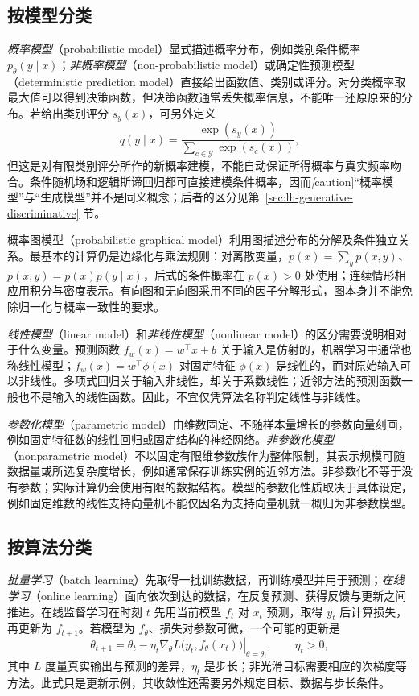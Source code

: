 \subsection{按模型分类}
\label{subsec:lh-model-categories}

\emph{概率模型}（probabilistic model）显式描述概率分布，例如类别条件概率 $p_\theta(y\mid x)$；\emph{非概率模型}（non-probabilistic model）或确定性预测模型（deterministic prediction model）直接给出函数值、类别或评分。对分类概率取最大值可以得到决策函数，但决策函数通常丢失概率信息，不能唯一还原原来的分布。若给出类别评分 $s_y(x)$，可另外定义
\[
    q(y\mid x)=\frac{\exp(s_y(x))}{\sum_{c\in\mathcal Y}\exp(s_c(x))},
\]
但这是对有限类别评分所作的新概率建模，不能自动保证所得概率与真实频率吻合。条件随机场和逻辑斯谛回归都可直接建模条件概率，因而\emph[caution]{“概率模型”与“生成模型”并不是同义概念}；后者的区分见第~\ref{sec:lh-generative-discriminative} 节。

概率图模型（probabilistic graphical model）利用图描述分布的分解及条件独立关系。最基本的计算仍是边缘化与乘法规则：对离散变量，$p(x)=\sum_y p(x,y)$、$p(x,y)=p(x)p(y\mid x)$，后式的条件概率在 $p(x)>0$ 处使用；连续情形相应用积分与密度表示。有向图和无向图采用不同的因子分解形式，图本身并不能免除归一化与概率一致性的要求。

\emph{线性模型}（linear model）和\emph{非线性模型}（nonlinear model）的区分需要说明相对于什么变量。预测函数 $f_w(x)=w^\top x+b$ 关于输入是仿射的，机器学习中通常也称线性模型；$f_w(x)=w^\top\phi(x)$ 对固定特征 $\phi(x)$ 是线性的，而对原始输入可以非线性。多项式回归关于输入非线性，却关于系数线性；近邻方法的预测函数一般也不是输入的线性函数。因此，不宜仅凭算法名称判定线性与非线性。

\emph{参数化模型}（parametric model）由维数固定、不随样本量增长的参数向量刻画，例如固定特征数的线性回归或固定结构的神经网络。\emph{非参数化模型}（nonparametric model）不以固定有限维参数族作为整体限制，其表示规模可随数据量或所选复杂度增长，例如通常保存训练实例的近邻方法。非参数化不等于没有参数；实际计算仍会使用有限的数据结构。模型的参数化性质取决于具体设定，例如固定维数的线性支持向量机不能仅因名为支持向量机就一概归为非参数模型。

\subsection{按算法分类}
\label{subsec:lh-algorithm-categories}

\emph{批量学习}（batch learning）先取得一批训练数据，再训练模型并用于预测；\emph{在线学习}（online learning）面向依次到达的数据，在反复预测、获得反馈与更新之间推进。在线监督学习在时刻 $t$ 先用当前模型 $f_t$ 对 $x_t$ 预测，取得 $y_t$ 后计算损失，再更新为 $f_{t+1}$。若模型为 $f_\theta$、损失对参数可微，一个可能的更新是
\[
    \theta_{t+1}=\theta_t-\eta_t
    \left.\nabla_\theta L\bigl(y_t,f_\theta(x_t)\bigr)
      \right|_{\theta=\theta_t},
    \qquad \eta_t>0,
\]
其中 $L$ 度量真实输出与预测的差异，$\eta_t$ 是步长；非光滑目标需要相应的次梯度等方法。此式只是更新示例，其收敛性还需要另外规定目标、数据与步长条件。

